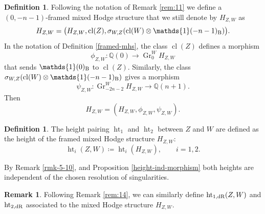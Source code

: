 \documentclass[11pt,a4paper]{amsart}
\newcommand{\Betti}{\text{\rm B}}
\newcommand{\dR}{\text{\rm dR}}
\newcommand{\Q}{\mathds{Q}}
\newcommand{\bfone}{{\mathds{1}}}
\DeclareMathOperator {\Gr} {Gr}
\DeclareMathOperator {\cl}{cl}
\DeclareMathOperator{\Ht}{ht}
\numberwithin{equation}{section}
\theoremstyle{plain}
\theoremstyle{definition}
\newtheorem{df}[prop]{Definition}
\newtheorem{rmk}[prop]{Remark}
\begin{document}
\begin{df}\label{def:13} Following the notation of Remark \ref{rem:11}
  we define a $(0,-n-1)$-framed mixed Hodge structure that we still
  denote by $H_{Z,W}$ as
  \begin{displaymath}
    H_{Z,W}=\big(H_{Z,W},\cl(Z), \sigma _{W,Z}(\cl(W)\otimes \bfone(-n-1)_{\Betti})\big).
  \end{displaymath}
In the notation of Definition \ref{framed-mhs}, 
the class $\cl(Z)$ defines a morphism 
  \begin{equation}\label{eq:47}
   \phi _{Z,W}\colon \Q(0)\to \Gr^{W}_{0}H_{Z,W}
  \end{equation}
  that sends $\bfone(0)_{\Betti}$ to $\cl(Z)$. Similarly, the class
$\sigma _{W,Z}(\cl(W)\otimes \bfone(-n-1)_{\Betti})$ gives a morphism
  \begin{equation}
    \label{eq:49}
    \psi _{Z,W}\colon \Gr^{W}_{-2n-2}H_{Z,W}\longrightarrow \Q(n+1).
  \end{equation}
  Then
  \begin{displaymath}
    H_{Z,W}=(H_{Z,W},\phi _{Z,W},\psi _{Z,W}).
  \end{displaymath}
\end{df}


    \begin{df}\label{def:12} 
    The height pairing $\Ht_1$ and $\Ht_{2}$ between $Z$ and $W$ are
    defined as the height of the framed mixed Hodge structure
    $H_{Z,W}$:
    \begin{displaymath}
      \Ht_{i}(Z,W)\coloneqq \Ht_{i}(H_{Z,W}),\qquad i=1,2.
    \end{displaymath}
  \end{df}
  By Remark \ref{rmk-5-10}, and Proposition \ref{height-ind-morphism}
  both heights are independent of the chosen resolution of singularities.
 \begin{rmk}\label{rmk:5-11}
 Following Remark \ref{rem:14}, we can similarly define $\Ht_{1,\dR}(Z,W)$ and $\Ht_{2,\dR}$ associated to the mixed Hodge structure $H_{Z,W}$.
 \end{rmk}
\end{document}
